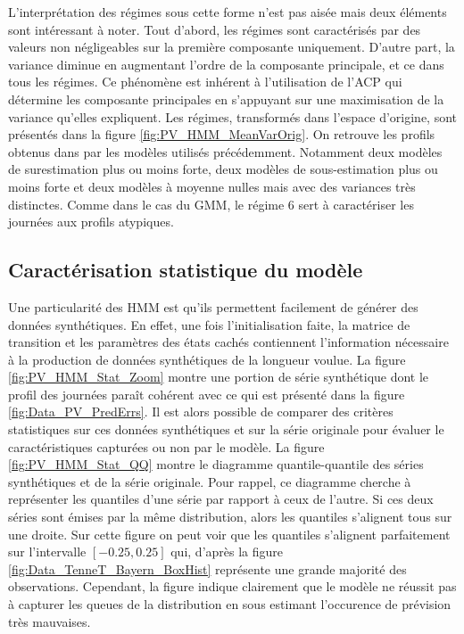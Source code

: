 \documentclass[12pt]{report}
\begin{document}
L'interprétation des régimes sous cette forme n'est pas aisée mais deux éléments sont intéressant à noter. Tout d'abord, les régimes sont caractérisés par des valeurs non négligeables sur la première composante uniquement. D'autre part, la variance diminue en augmentant l'ordre de la composante principale, et ce dans tous les régimes. Ce phénomène est inhérent à l'utilisation de l'ACP qui détermine les composante principales en s'appuyant sur une maximisation de la variance qu'elles expliquent. Les régimes, transformés dans l'espace d'origine, sont présentés dans la figure \ref{fig:PV_HMM_MeanVarOrig}. On retrouve les profils obtenus dans par les modèles utilisés précédemment. Notamment deux modèles de surestimation plus ou moins forte, deux modèles de sous-estimation plus ou moins forte et deux modèles à moyenne nulles mais avec des variances très distinctes. Comme dans le cas du GMM, le régime 6 sert à caractériser les journées aux profils atypiques. 


\subsection{Caractérisation statistique du modèle}
Une particularité des HMM est qu'ils permettent facilement de générer des données synthétiques. En effet, une fois l'initialisation faite, la matrice de transition et les paramètres des états cachés contiennent l'information nécessaire à la production de données synthétiques de la longueur voulue. La figure \ref{fig:PV_HMM_Stat_Zoom} montre une portion de série synthétique dont le profil des journées paraît cohérent avec ce qui est présenté dans la figure \ref{fig:Data_PV_PredErrs}. Il est alors possible de comparer des critères statistiques sur ces données synthétiques et sur la série originale pour évaluer le caractéristiques capturées ou non par le modèle. La figure \ref{fig:PV_HMM_Stat_QQ} montre le diagramme quantile-quantile des séries synthétiques et de la série originale. Pour rappel, ce diagramme cherche à représenter les quantiles d'une série par rapport à ceux de l'autre. Si ces deux séries sont émises par la même distribution, alors les quantiles s'alignent tous sur une droite. Sur cette figure on peut voir que les quantiles s'alignent parfaitement sur l'intervalle $[-0.25,0.25]$ qui, d'après la figure \ref{fig:Data_TenneT_Bayern_BoxHist} représente une grande majorité des observations. Cependant, la figure indique clairement que le modèle ne réussit pas à capturer les queues de la distribution en sous estimant l'occurence de prévision très mauvaises.
\end{document}
